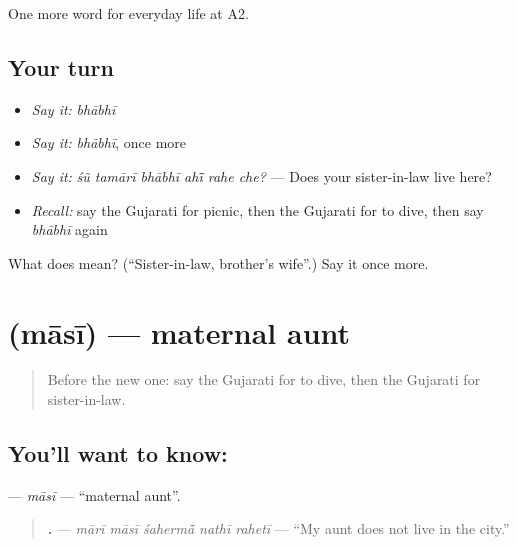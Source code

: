 \begin{grammarlens}[title={What you've built}]
One more word for everyday life at A2.
\end{grammarlens}

\subsection*{Your turn}
\begin{itemize}
\raggedright
  \item \emph{Say it:} \emph{bhābhī}
  \item \emph{Say it:} \emph{bhābhī}, once more
  \item \emph{Say it:} \emph{śũ tamārī bhābhī ahī̃ rahe che?} — Does your sister-in-law live here?
  \item \emph{Recall:} say the Gujarati for picnic, then the Gujarati for to dive, then say \emph{bhābhī} again
\end{itemize}

\begin{tcolorbox}[breakable,colback=teal!4,colframe=teal!35!black,title={Before you move on}]
What does  mean? (\textquotedblleft{}Sister-in-law, brother's wife\textquotedblright{}.) Say it once more.
\end{tcolorbox}
\section[\texorpdfstring{\gu{માસી} (māsī)}{માસી (māsī)}]{ (māsī) — maternal aunt}

\label{lesson:GU-C263-masi}



\begin{quote}
Before the new one: say the Gujarati for to dive, then the Gujarati for sister-in-law.
\end{quote}

\subsection*{You'll want to know: }
\textbf{} — \emph{māsī} — \textquotedblleft{}maternal aunt\textquotedblright{}.

\begin{quote}
\textbf{    .} — \emph{mārī māsī śahermā̃ nathī rahetī} — \textquotedblleft{}My aunt does not live in the city.\textquotedblright{}
\end{quote}

